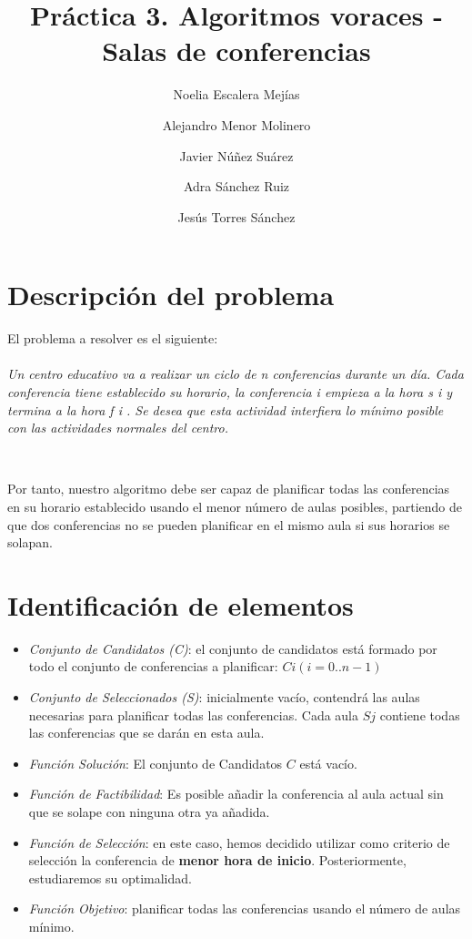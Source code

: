 \documentclass{article}
\title{Práctica 3. Algoritmos voraces - Salas de conferencias}
\author{Noelia Escalera Mejías \\
	\and Alejandro Menor Molinero \\
	\and Javier Núñez Suárez \\
	\and Adra Sánchez Ruiz \\
	\and Jesús Torres Sánchez}
\begin{document}
	\maketitle
	\section{Descripción del problema}
	El problema a resolver es el siguiente: 
	\\ 
	\\
	\textit{Un centro educativo va a realizar un ciclo de n conferencias durante un día. Cada conferencia
	tiene establecido su horario, la conferencia i empieza a la hora s i y termina a la hora f i . Se desea que esta actividad interfiera lo mínimo posible con las actividades normales del centro.}
	
	\
	
	Por tanto, nuestro algoritmo debe ser capaz de planificar todas las conferencias en su horario establecido usando el menor número de aulas posibles, partiendo de que dos conferencias no se pueden planificar en el mismo aula si sus horarios se solapan.
	
	\section{Identificación de elementos}
	\begin{itemize}
		\item \textit{Conjunto de Candidatos (C)}: el conjunto de candidatos está formado por todo el conjunto de conferencias a planificar: $Ci (i=0..n-1)$
		
		\item \textit{Conjunto de Seleccionados (S)}: inicialmente vacío, contendrá las aulas necesarias para planificar todas las conferencias. Cada aula $Sj$ contiene todas las conferencias que se darán en esta aula.
		
		\item \textit{Función Solución}: El conjunto de Candidatos $C$ está vacío.
		
		\item \textit{Función de Factibilidad}: Es posible añadir la conferencia al aula actual sin que se solape con ninguna otra ya añadida. 
		
		\item \textit{Función de Selección}: en este caso, hemos decidido utilizar como criterio de selección la conferencia de \textbf{menor hora de inicio}. Posteriormente, estudiaremos su optimalidad.
		
		\item \textit{Función Objetivo}: planificar todas las conferencias usando el número de aulas mínimo.
	\end{itemize}
	
\end{document}
